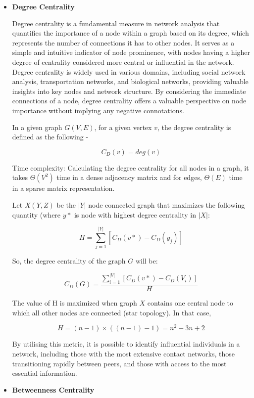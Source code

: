 \documentclass{article}
\begin{document}
\begin{itemize}

\item \textbf{Degree Centrality}

Degree centrality is a fundamental measure in network analysis that quantifies the importance of a node within a graph based on its degree, which represents the number of connections it has to other nodes. It serves as a simple and intuitive indicator of node prominence, with nodes having a higher degree of centrality considered more central or influential in the network. Degree centrality is widely used in various domains, including social network analysis, transportation networks, and biological networks, providing valuable insights into key nodes and network structure. By considering the immediate connections of a node, degree centrality offers a valuable perspective on node importance without implying any negative connotations.

In a given graph $G(V, E)$, for a given vertex $v$, the degree centrality is defined as the following -

$$ C_{D}(v) = deg(v) $$

Time complexity: Calculating the degree centrality for all nodes in a graph, it takes $\Theta(V^{2})$ time in a dense adjacency matrix and for edges, $\Theta(E)$ time in a sparse matrix representation.

Let $X(Y,Z)$ be the $|Y|$ node connected graph that maximizes the following quantity (where $y*$ is node with highest degree centrality in $|X|$:

$$ H = \sum_{j = 1}^{|Y|} [C_{D}(v*) - C_{D}(y_{j})]$$

So, the degree centrality of the graph $G$ will be:

$$ C_{D}(G) = \frac{\sum_{i=1}^{|V|}[C_{D}(v*) - C_{D}(V_i)]}{H} $$

The value of H is maximized when graph $X$ contains one central node to which all other nodes are connected (star topology). In that case, 

$$H = (n-1) \times ((n-1)-1) = n^{2}-3n+2 $$

By utilising this metric, it is possible to identify influential individuals in a network, including those with the most extensive contact networks, those transitioning rapidly between peers, and those with access to the most essential information.

\item \textbf{Betweenness Centrality}


\end{itemize}
\end{document}
